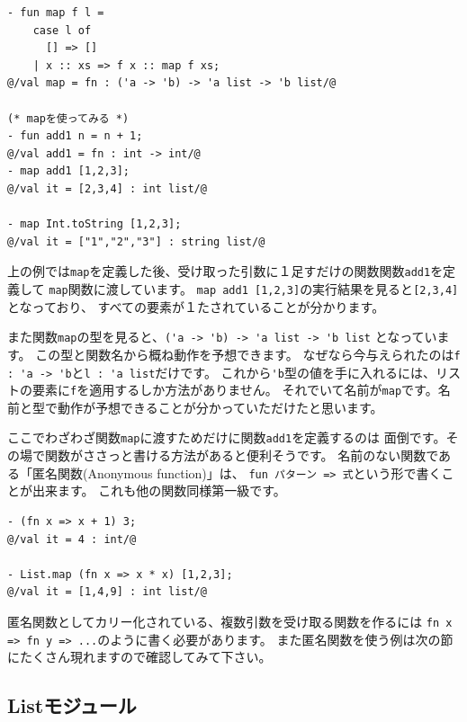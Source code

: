 \documentclass[11pt,a4paper]{article}
\begin{document}
\begin{lstlisting}[caption=関数fとリストlを受け取り、lの要素全てにfを適用する関数, label=code:map]
- fun map f l =
    case l of
      [] => []
    | x :: xs => f x :: map f xs;
@/val map = fn : ('a -> 'b) -> 'a list -> 'b list/@

(* mapを使ってみる *)
- fun add1 n = n + 1;
@/val add1 = fn : int -> int/@
- map add1 [1,2,3];
@/val it = [2,3,4] : int list/@

- map Int.toString [1,2,3];
@/val it = ["1","2","3"] : string list/@
\end{lstlisting}

上の例では\lstinline{map}を定義した後、受け取った引数に１足すだけの関数関数\lstinline{add1}を定義して
\lstinline{map}関数に渡しています。
\lstinline{map add1 [1,2,3]}の実行結果を見ると\lstinline{[2,3,4]}となっており、
すべての要素が１たされていることが分かります。

また関数\lstinline{map}の型を見ると、\lstinline{('a -> 'b) -> 'a list -> 'b list}
となっています。
この型と関数名から概ね動作を予想できます。
なぜなら今与えられたのは\lstinline{f : 'a -> 'b}と\lstinline{l : 'a list}だけです。
これから\lstinline{'b}型の値を手に入れるには、リストの要素に\lstinline{f}を適用するしか方法がありません。
それでいて名前が\lstinline{map}です。名前と型で動作が予想できることが分かっていただけたと思います。

ここでわざわざ関数\lstinline{map}に渡すためだけに関数\lstinline{add1}を定義するのは
面倒です。その場で関数がささっと書ける方法があると便利そうです。
名前のない関数である「匿名関数(Anonymous function)」は、
\lstinline{fun パターン => 式}という形で書くことが出来ます。
これも他の関数同様第一級です。

\begin{lstlisting}[caption=匿名関数,label=code:anonymous]
- (fn x => x + 1) 3;
@/val it = 4 : int/@

- List.map (fn x => x * x) [1,2,3];
@/val it = [1,4,9] : int list/@
\end{lstlisting}

匿名関数としてカリー化されている、複数引数を受け取る関数を作るには
\lstinline{fn x => fn y => ...}のように書く必要があります。
また匿名関数を使う例は次の節にたくさん現れますので確認してみて下さい。

\subsection{Listモジュール}
\end{document}
